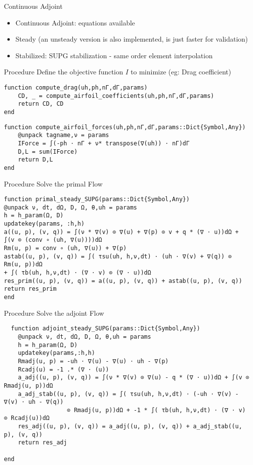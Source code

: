 \begin{frame}{Continuous Adjoint}
\begin{itemize}
\item Continuous Adjoint: equations available
\item Steady (an unsteady version is also implemented, is just faster for validation)
\item Stabilized: SUPG stabilization - same order element interpolation
\end{itemize}
\end{frame}


\begin{frame}[fragile]{Procedure}
Define the objective function $I$ to minimize (eg: Drag coefficient)

\begin{verbatim}
function compute_drag(uh,ph,nΓ,dΓ,params)
    CD, _ = compute_airfoil_coefficients(uh,ph,nΓ,dΓ,params)
    return CD, CD
end
\end{verbatim}

\begin{verbatim}
function compute_airfoil_forces(uh,ph,nΓ,dΓ,params::Dict{Symbol,Any})
    @unpack tagname,ν = params
    IForce = ∫(-ph ⋅ nΓ + ν* transpose(∇(uh)) ⋅ nΓ)dΓ
    D,L = sum(IForce)
    return D,L
end
\end{verbatim}
\end{frame}


\begin{frame}[fragile]{Procedure}
Solve the primal Flow
  \begin{verbatim}
function primal_steady_SUPG(params::Dict{Symbol,Any})
@unpack ν, dt, dΩ, D, Ω, θ,uh = params
h = h_param(Ω, D)
updatekey(params, :h,h)
a((u, p), (v, q)) = ∫(ν * ∇(v) ⊙ ∇(u) + ∇(p) ⊙ v + q * (∇ ⋅ u))dΩ + ∫(v ⊙ (conv ∘ (uh, ∇(u))))dΩ
Rm(u, p) = conv ∘ (uh, ∇(u)) + ∇(p)
astab((u, p), (v, q)) = ∫( τsu(uh, h,ν,dt) ⋅ (uh ⋅ ∇(v) + ∇(q)) ⊙ Rm(u, p))dΩ 
+ ∫( τb(uh, h,ν,dt) ⋅ (∇ ⋅ v) ⊙ (∇ ⋅ u))dΩ
res_prim((u, p), (v, q)) = a((u, p), (v, q)) + astab((u, p), (v, q))
return res_prim
end
\end{verbatim}
\end{frame}


\begin{frame}[fragile]{Procedure}
  Solve the adjoint Flow
    \begin{verbatim}
  function adjoint_steady_SUPG(params::Dict{Symbol,Any})
    @unpack ν, dt, dΩ, D, Ω, θ,uh = params
    h = h_param(Ω, D)
    updatekey(params,:h,h)   
    Rmadj(u, p) = -uh ⋅ ∇(u) - ∇(u) ⋅ uh - ∇(p)
    Rcadj(u) = -1 .* (∇ ⋅ (u))
    a_adj((u, p), (v, q)) = ∫(ν * ∇(v) ⊙ ∇(u) - q * (∇ ⋅ u))dΩ + ∫(v ⊙ Rmadj(u, p))dΩ
    a_adj_stab((u, p), (v, q)) = ∫( τsu(uh, h,ν,dt) ⋅ (-uh ⋅ ∇(v) - ∇(v) ⋅ uh - ∇(q)) 
                  ⊙ Rmadj(u, p))dΩ + -1 * ∫( τb(uh, h,ν,dt) ⋅ (∇ ⋅ v) ⊙ Rcadj(u))dΩ
    res_adj((u, p), (v, q)) = a_adj((u, p), (v, q)) + a_adj_stab((u, p), (v, q))
    return res_adj

end
  \end{verbatim}
  \end{frame}

